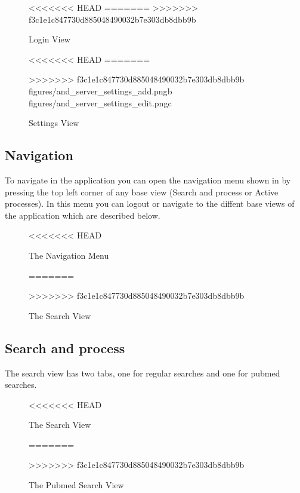 \begin{figure}[h]
<<<<<<< HEAD
=======
>>>>>>> f3c1e1c847730d885048490032b7e303db8dbb9b
\caption{Login View}
\label{fig:and_login_man}
\end{figure}
\FloatBarrier

\begin{figure}[h]
<<<<<<< HEAD
=======

>>>>>>> f3c1e1c847730d885048490032b7e303db8dbb9b
		{figures/and_server_settings_add.png}{b}
		{figures/and_server_settings_edit.png}{c}
\caption{Settings View}
\label{fig:and_settings_man}
\end{figure}
\FloatBarrier

\subsection{Navigation}
To navigate in the application you can open the navigation menu shown in  by pressing the top left corner of any base view (Search and process or Active processes). In this menu you can logout or navigate to the diffent base views of the application which are described below.

\begin{figure}[h]
<<<<<<< HEAD
\caption{The Navigation Menu}
\label{fig:and_main_nav}
=======
\caption{The Search View}
\label{fig:and_search_man}
>>>>>>> f3c1e1c847730d885048490032b7e303db8dbb9b
\end{figure}
\FloatBarrier

\subsection{Search and process}\label{sec:and_search}
The search view has two tabs, one for regular searches and one for pubmed searches.

\begin{figure}[h]
<<<<<<< HEAD
\caption{The Search View}
\label{fig:and_search_man}
=======
\caption{The Pubmed Search View}
\label{fig:and_pubmed_man} 
>>>>>>> f3c1e1c847730d885048490032b7e303db8dbb9b
\end{figure}
\FloatBarrier

